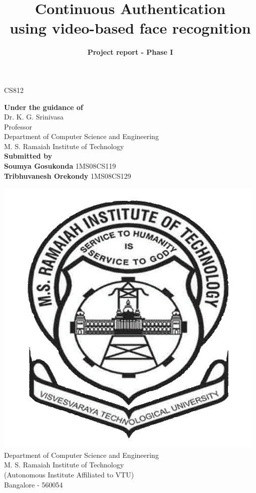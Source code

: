 \documentclass[12pt]{article}			%
\title{Continuous Authentication\\using video-based face recognition}	%
\author{{\bf Project report - Phase I}{\bf}}
\date{}				%
\begin{document}

\maketitle				%
\thispagestyle{empty}			%

\begin{center}

{\Large CS812}\\[3ex]
{\Large}

{\large}
{\bf Under the guidance of }{\bf}\\[2ex]
Dr. K. G. Srinivasa\\
Professor\\
Department of Computer Science and Engineering\\
M. S. Ramaiah Institute of Technology\\[3ex]


{\bf Submitted by}{\bf}\\[2ex]
{\bf Soumya Gosukonda }{\bf} 1MS08CS119\\
{\bf Tribhuvanesh Orekondy }{\bf} 1MS08CS129\\[8ex]
{\large}

\includegraphics[scale=0.20]{msrit.png}\\
Department of Computer Science and Engineering\\
M. S. Ramaiah Institute of Technology\\
(Autonomous Institute Affiliated to VTU)\\
Bangalore - 560054
\end{center}
\end{document}
